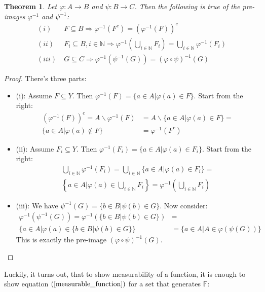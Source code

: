 \documentclass[12pt, a4paper]{article}
\newtheorem{theorem}{Theorem}[section]
\numberwithin{equation}{section}
\begin{document}
\begin{theorem}
\label{pre-image}
Let $\varphi: A\rightarrow B$ and $\psi: B\rightarrow C$. Then the following is true of the pre-images $\varphi^{-1}$ and $\psi^{-1}$:
\begin{align}
(i)\ &F\subseteq B\Rightarrow\varphi^{-1}(F^c)=(\varphi^{-1}(F))^c\\
(ii)\ &F_i\subseteq B, i\in\mathbb{N}\Rightarrow\varphi^{-1}\left(\bigcup_{i\in\mathbb{N}}F_i\right)=\bigcup_{i\in\mathbb{N}}\varphi^{-1}(F_i)\\
(iii)\ &G\subseteq C\Rightarrow\varphi^{-1}(\psi^{-1}(G))=(\varphi\circ\psi)^{-1}(G)
\end{align}
\end{theorem}
\begin{proof}
There's three parts:
\begin{itemize}
\item (i): Assume $F\subseteq Y$. Then $\varphi^{-1}(F)=\{a\in A|\varphi(a)\in F\}$. Start from the right:
\begin{align}
(\varphi^{-1}(F))^c=A\backslash\varphi^{-1}(F)&=A\backslash\{a\in A|\varphi(a)\in F\}=\\
\{a\in A|\varphi(a)\notin F\}&=\varphi^{-1}(F^c)
\end{align}
\item (ii): Assume $F_i\subseteq Y$. Then $\varphi^{-1}(F_i)=\{a\in A|\varphi(a)\in F_i\}$. Start from the right:
\begin{align}
\bigcup_{i\in\mathbb{N}}\varphi^{-1}(F_i)=\bigcup_{i\in\mathbb{N}}\{a\in A|\varphi(a)\in F_i\}=\\
\left\{a\in A|\varphi(a)\in\bigcup_{i\in\mathbb{N}}F_i\right\}=\varphi^{-1}\left(\bigcup_{i\in\mathbb{N}}F_i\right)
\end{align}
\item (iii): We have $\psi^{-1}(G)=\{b\in B|\psi(b)\in G\}$. Now consider:
\begin{align}
\varphi^{-1}(\psi^{-1}(G))=\varphi^{-1}(\{b\in B|\psi(b)\in G\})&=\\
\{a\in A|\varphi(a)\in\{b\in B|\psi(b)\in G\}\}&=\{a\in A|A\in\varphi(\psi(G))\}
\end{align}
This is exactly the pre-image $(\varphi\circ\psi)^{-1}(G)$.
\end{itemize}
\end{proof}

Luckily, it turns out, that to show measurability of a function, it is enough to show equation $(\ref{measurable_function})$ for a set that generates $\mathbb{F}$:
\end{document}
